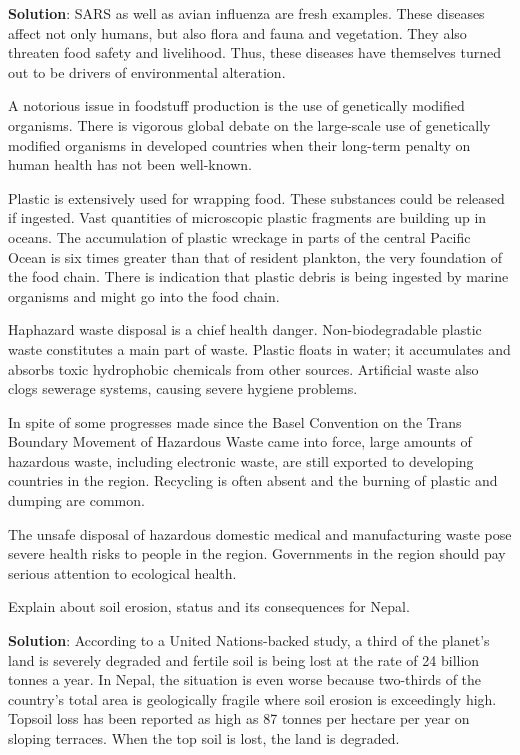\documentclass[
  openany]{book}
\newcommand{\question}{\item}
\newenvironment{solution}{ {\bfseries Solution}:}{}
\begin{document}
\begin{questions}
\begin{solution}
SARS as well as avian influenza are fresh examples. These diseases affect not only humans, but also flora and fauna and vegetation. They also threaten food safety and livelihood. Thus, these diseases have themselves turned out to be drivers of environmental alteration.

A notorious issue in foodstuff production is the use of genetically modified organisms. There is vigorous global debate on the large-scale use of genetically modified organisms in developed countries when their long-term penalty on human health has not been well-known.

Plastic is extensively used for wrapping food. These substances could be released if ingested. Vast quantities of microscopic plastic fragments are building up in oceans. The accumulation of plastic wreckage in parts of the central Pacific Ocean is six times greater than that of resident plankton, the very foundation of the food chain. There is indication that plastic debris is being ingested by marine organisms and might go into the food chain.

Haphazard waste disposal is a chief health danger. Non-biodegradable plastic waste constitutes a main part of waste. Plastic floats in water; it accumulates and absorbs toxic hydrophobic chemicals from other sources. Artificial waste also clogs sewerage systems, causing severe hygiene problems.

In spite of some progresses made since the Basel Convention on the Trans Boundary Movement of Hazardous Waste came into force, large amounts of hazardous waste, including electronic waste, are still exported to developing countries in the region. Recycling is often absent and the burning of plastic and dumping are common.

The unsafe disposal of hazardous domestic medical and manufacturing waste pose severe health risks to people in the region. Governments in the region should pay serious attention to ecological health.

\end{solution}

\question Explain about soil erosion, status and its consequences for Nepal. 

\begin{solution}
According to a United Nations-backed study, a third of the planet's land is severely degraded and fertile soil is being lost at the rate of 24 billion tonnes a year. In Nepal, the situation is even worse because two-thirds of the country's total area is geologically fragile where soil erosion is exceedingly high. Topsoil loss has been reported as high as 87 tonnes per hectare per year on sloping terraces. When the top soil is lost, the land is degraded.


\end{solution}
\end{questions}
\end{document}
